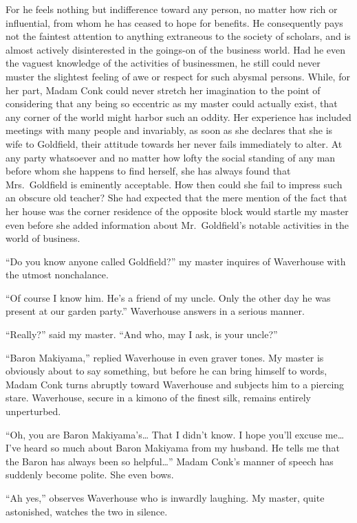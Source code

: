 \documentclass[12pt, openright]{book}
\begin{document}
For he feels nothing but indifference toward any person, no matter how
rich or influential, from whom he has ceased to hope for benefits. He
consequently pays not the faintest attention to anything extraneous to
the society of scholars, and is almost actively disinterested in the
goings-on of the business world. Had he even the vaguest knowledge of
the activities of businessmen, he still could never muster the slightest
feeling of awe or respect for such abysmal persons. While, for her part,
Madam Conk could never stretch her imagination to the point of
considering that any being so eccentric as my master could actually
exist, that any corner of the world might harbor such an oddity. Her
experience has included meetings with many people and invariably, as
soon as she declares that she is wife to Goldfield, their attitude
towards her never fails immediately to alter. At any party whatsoever
and no matter how lofty the social standing of any man before whom she
happens to find herself, she has always found that Mrs.~Goldfield is
eminently acceptable. How then could she fail to impress such an obscure
old teacher? She had expected that the mere mention of the fact that her
house was the corner residence of the opposite block would startle my
master even before she added information about Mr.~Goldfield's notable
activities in the world of business.

``Do you know anyone called Goldfield?'' my master inquires of
Waverhouse with the utmost nonchalance.

``Of course I know him. He's a friend of my uncle. Only the other day he
was present at our garden party.'' Waverhouse answers in a serious
manner.

``Really?'' said my master. ``And who, may I ask, is your uncle?''

``Baron Makiyama,'' replied Waverhouse in even graver tones. My master
is obviously about to say something, but before he can bring himself to
words, Madam Conk turns abruptly toward Waverhouse and subjects him to a
piercing stare. Waverhouse, secure in a kimono of the finest silk,
remains entirely unperturbed.

``Oh, you are Baron Makiyama's\ldots{} That I didn't know. I hope you'll
excuse me\ldots{} I've heard so much about Baron Makiyama from my
husband. He tells me that the Baron has always been so helpful\ldots{}''
Madam Conk's manner of speech has suddenly become polite. She even bows.

``Ah yes,'' observes Waverhouse who is inwardly laughing. My master,
quite astonished, watches the two in silence.
\end{document}

